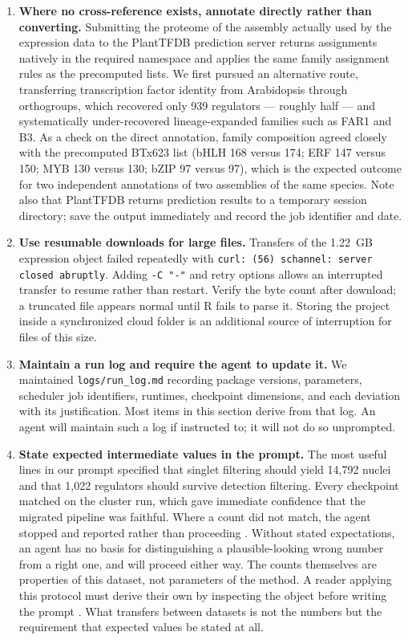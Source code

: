 \begin{enumerate}[leftmargin=*]
\item \textbf{Where no cross-reference exists, annotate directly rather than converting.} Submitting the proteome of the assembly actually used by the expression data to the PlantTFDB prediction server returns assignments natively in the required namespace and applies the same family assignment rules as the precomputed lists. We first pursued an alternative route, transferring transcription factor identity from Arabidopsis through orthogroups, which recovered only 939 regulators --- roughly half --- and systematically under-recovered lineage-expanded families such as FAR1 and B3. As a check on the direct annotation, family composition agreed closely with the precomputed BTx623 list (bHLH 168 versus 174; ERF 147 versus 150; MYB 130 versus 130; bZIP 97 versus 97), which is the expected outcome for two independent annotations of two assemblies of the same species. Note also that PlantTFDB returns prediction results to a temporary session directory; save the output immediately and record the job identifier and date.


\item \textbf{Use resumable downloads for large files.} Transfers of the 1.22~GB expression object failed repeatedly with \texttt{curl: (56) schannel: server closed abruptly}. Adding \texttt{-C "-"} and retry options allows an interrupted transfer to resume rather than restart. Verify the byte count after download; a truncated file appears normal until R fails to parse it. Storing the project inside a synchronized cloud folder is an additional source of interruption for files of this size.


\item \textbf{Maintain a run log and require the agent to update it.} We maintained \texttt{logs/run\_log.md} recording package versions, parameters, scheduler job identifiers, runtimes, checkpoint dimensions, and each deviation with its justification. Most items in this section derive from that log. An agent will maintain such a log if instructed to; it will not do so unprompted.

\item \textbf{State expected intermediate values in the prompt.} The most useful lines in our prompt specified that singlet filtering should yield 14,792 nuclei and that 1,022 regulators should survive detection filtering. Every checkpoint matched on the cluster run, which gave immediate confidence that the migrated pipeline was faithful. Where a count did not match, the agent stopped and reported rather than proceeding . Without stated expectations, an agent has no basis for distinguishing a plausible-looking wrong number from a right one, and will proceed either way. The counts themselves are properties of this dataset, not parameters of the method. A reader applying this protocol must derive their own by inspecting the object before writing the prompt . What transfers between datasets is not the numbers but the requirement that expected values be stated at all.


\end{enumerate}

